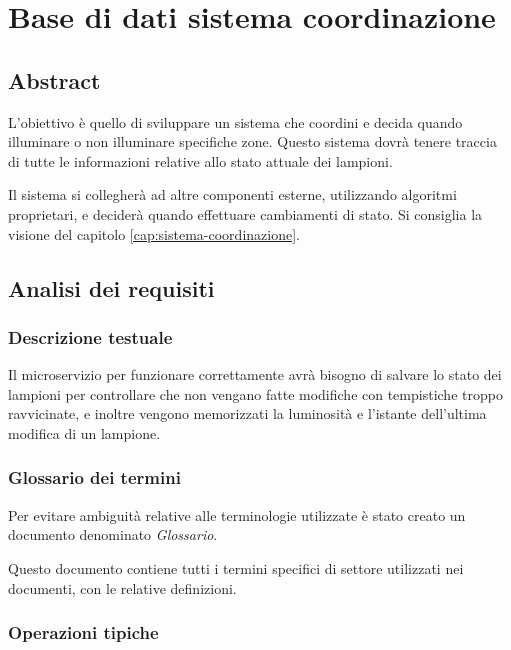 \section{Base di dati sistema coordinazione}\label{sec:sbd-sistema-coordinazione}

\subsection{Abstract}

L'obiettivo è quello di sviluppare un sistema che coordini e decida quando illuminare o non illuminare specifiche zone. Questo sistema dovrà tenere traccia di tutte le informazioni relative allo stato attuale dei lampioni.

Il sistema si collegherà ad altre componenti esterne, utilizzando algoritmi proprietari, e deciderà quando effettuare cambiamenti di stato. Si consiglia la visione del capitolo \ref{cap:sistema-coordinazione}.

\subsection{Analisi dei requisiti}

\subsubsection{Descrizione testuale}

Il microservizio per funzionare correttamente avrà bisogno di salvare lo stato dei lampioni per controllare che non vengano fatte modifiche con tempistiche troppo ravvicinate, e inoltre vengono memorizzati la luminosità e l'istante dell'ultima modifica di un lampione. 

\subsubsection{Glossario dei termini}

Per evitare ambiguità relative alle terminologie utilizzate è stato creato un documento denominato \textit{Glossario}.

Questo documento contiene tutti i termini specifici di settore utilizzati nei documenti, con le relative definizioni.

\subsubsection{Operazioni tipiche}

